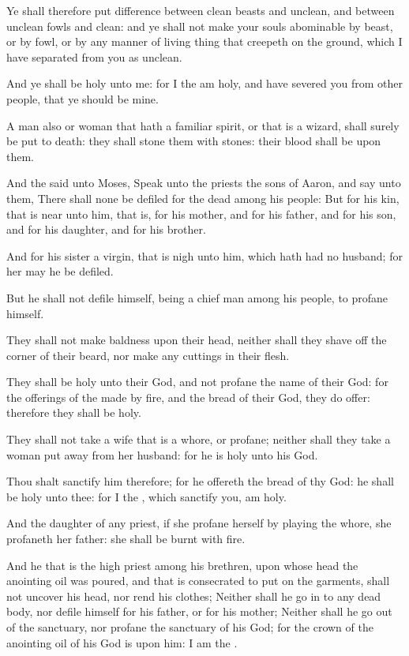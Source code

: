 \Verse Ye shall therefore put difference between clean beasts and unclean, and between unclean fowls and clean: and ye shall not make your souls abominable by beast, or by fowl, or by any manner of living thing that creepeth on the ground, which I have separated from you as unclean.

\Verse And ye shall be holy unto me: for I the \LORD am holy, and have severed you from other people, that ye should be mine.

\Verse A man also or woman that hath a familiar spirit, or that is a wizard, shall surely be put to death: they shall stone them with stones: their blood shall be upon them.

\Chapter
\Verse And the \LORD said unto Moses, Speak unto the priests the sons of Aaron, and say unto them, There shall none be defiled for the dead among his people: \Verse But for his kin, that is near unto him, that is, for his mother, and for his father, and for his son, and for his daughter, and for his brother.

\Verse And for his sister a virgin, that is nigh unto him, which hath had no husband; for her may he be defiled.

\Verse But he shall not defile himself, being a chief man among his people, to profane himself.

\Verse They shall not make baldness upon their head, neither shall they shave off the corner of their beard, nor make any cuttings in their flesh.

\Verse They shall be holy unto their God, and not profane the name of their God: for the offerings of the \LORD made by fire, and the bread of their God, they do offer: therefore they shall be holy.

\Verse They shall not take a wife that is a whore, or profane; neither shall they take a woman put away from her husband: for he is holy unto his God.

\Verse Thou shalt sanctify him therefore; for he offereth the bread of thy God: he shall be holy unto thee: for I the \LORD, which sanctify you, am holy.

\Verse And the daughter of any priest, if she profane herself by playing the whore, she profaneth her father: she shall be burnt with fire.

\Verse And he that is the high priest among his brethren, upon whose head the anointing oil was poured, and that is consecrated to put on the garments, shall not uncover his head, nor rend his clothes; \Verse Neither shall he go in to any dead body, nor defile himself for his father, or for his mother; \Verse Neither shall he go out of the sanctuary, nor profane the sanctuary of his God; for the crown of the anointing oil of his God is upon him: I am the \LORD.

